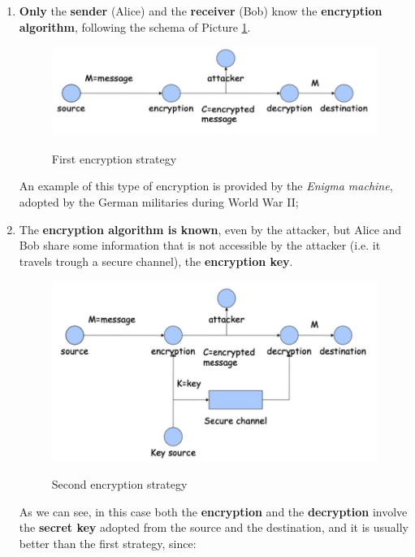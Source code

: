 \begin{enumerate}
    \item \textbf{Only} the \textbf{sender} (Alice) and the \textbf{receiver} (Bob) know the \textbf{encryption algorithm}, following the schema of Picture \ref{cl1}.

    \begin{figure}[h!]
        \centering
        \includegraphics[scale = 1.2]{img/cl1.jpg}
        \label{cl1}
        \caption{First encryption strategy}
    \end{figure}

    An example of this type of encryption is provided by the \textit{Enigma machine}, adopted by the German militaries during World War II;

    \item The \textbf{encryption algorithm is known}, even by the attacker, but Alice and Bob share some information that is not accessible by the attacker (i.e. it travels trough a secure channel), the \textbf{encryption key}.

    \begin{figure}[h!]
        \centering
        \includegraphics[scale = 1.2]{img/cl2.jpg}
        \label{cl2}
        \caption{Second encryption strategy}
    \end{figure}

    As we can see, in this case both the \textbf{encryption} and the \textbf{decryption} involve the \textbf{secret key} adopted from the source and the destination, and it is usually better than the first strategy, since:


\end{enumerate}
